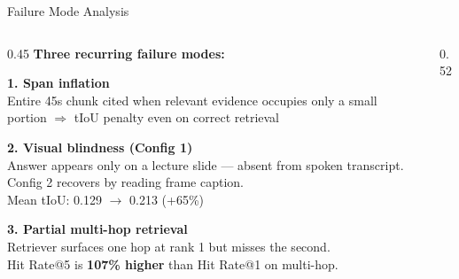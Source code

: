 \documentclass[aspectratio=169,t]{beamer}
\begin{document}
\begin{frame}{Failure Mode Analysis}

\begin{columns}[T]
\begin{column}{0.45\textwidth}
  \textbf{Three recurring failure modes:}

  \medskip
  \textbf{1. Span inflation}\\
  Entire 45s chunk cited when relevant evidence occupies only a small portion
  $\Rightarrow$ tIoU penalty even on correct retrieval

  \medskip
  \textbf{2. Visual blindness (Config 1)}\\
  Answer appears only on a lecture slide — absent from spoken transcript.
  Config 2 recovers by reading frame caption.\\
  {\small Mean tIoU: 0.129 $\to$ 0.213 (+65\%)}

  \medskip
  \textbf{3. Partial multi-hop retrieval}\\
  Retriever surfaces one hop at rank 1 but misses the second.\\
  Hit Rate@5 is \textbf{107\% higher} than Hit Rate@1 on multi-hop.

\end{column}
\begin{column}{0.52\textwidth}
  \small
  \setlength{\fboxsep}{6pt}


\end{column}
\end{columns}
\end{frame}
\end{document}

